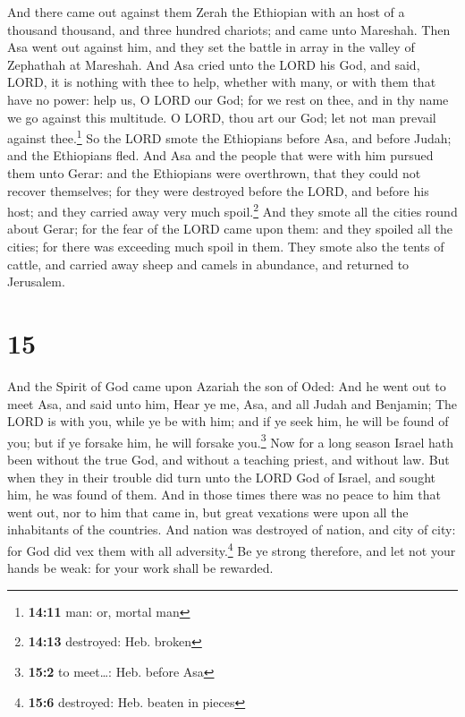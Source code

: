  And there came out against them Zerah the Ethiopian with
an host of a thousand thousand, and three hundred chariots; and came
unto Mareshah.  Then Asa went out against him, and they
set the battle in array in the valley of Zephathah at Mareshah.
 And Asa cried unto the LORD his God, and said, LORD, it
is nothing with thee to help, whether with many, or with them that have
no power: help us, O LORD our God; for we rest on thee, and in thy name
we go against this multitude. O LORD, thou art our God; let not man
prevail against thee.\footnote{\textbf{14:11} man: or, mortal man}
 So the LORD smote the Ethiopians before Asa, and before
Judah; and the Ethiopians fled.  And Asa and the people
that were with him pursued them unto Gerar: and the Ethiopians were
overthrown, that they could not recover themselves; for they were
destroyed before the LORD, and before his host; and they carried away
very much spoil.\footnote{\textbf{14:13} destroyed: Heb. broken}
 And they smote all the cities round about Gerar; for the
fear of the LORD came upon them: and they spoiled all the cities; for
there was exceeding much spoil in them.  They smote also
the tents of cattle, and carried away sheep and camels in abundance, and
returned to Jerusalem.

\hypertarget{section-14}{%
\section{15}\label{section-14}}

 And the Spirit of God came upon Azariah the son of Oded:
 And he went out to meet Asa, and said unto him, Hear ye
me, Asa, and all Judah and Benjamin; The LORD is with you, while ye be
with him; and if ye seek him, he will be found of you; but if ye forsake
him, he will forsake you.\footnote{\textbf{15:2} to meet\ldots: Heb.
  before Asa}  Now for a long season Israel hath been
without the true God, and without a teaching priest, and without law.
 But when they in their trouble did turn unto the LORD God
of Israel, and sought him, he was found of them.  And in
those times there was no peace to him that went out, nor to him that
came in, but great vexations were upon all the inhabitants of the
countries.  And nation was destroyed of nation, and city
of city: for God did vex them with all adversity.\footnote{\textbf{15:6}
  destroyed: Heb. beaten in pieces}  Be ye strong
therefore, and let not your hands be weak: for your work shall be
rewarded.

